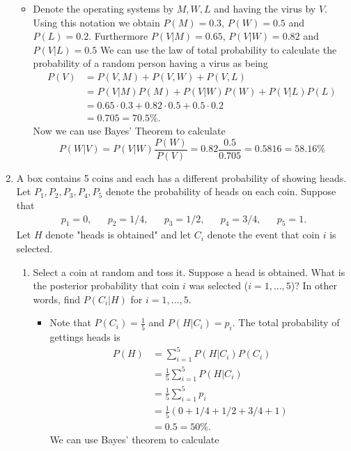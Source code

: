 \documentclass{article}
\begin{document}
\begin{enumerate}
		\begin{itemize}
			\item Denote the operating systems by $M, W, L$ and having the virus by $V$. Using this notation we obtain $P(M) = 0.3$, $P(W) = 0.5$ and $P(L) = 0.2$. Furthermore $P(V|M) = 0.65$, $P(V|W) = 0.82$ and $P(V|L) = 0.5$ We can use the law of total probability to calculate the probability of a random person having a virus as being
			$$
			\begin{aligned}
			P(V) &= P(V, M) + P(V, W) + P(V, L) \\
			&= P(V|M)P(M) + P(V|W)P(W) + P(V|L)P(L) \\
			&= 0.65 \cdot 0.3 + 0.82 \cdot 0.5 + 0.5 \cdot 0.2 \\
			&= 0.705 = 70.5\%.
			\end{aligned}
			$$
			Now we can use Bayes' Theorem to calculate
			$$
			P(W|V) = P(V|W) \frac{P(W)}{P(V)} = 0.82 \frac{0.5}{0.705} = 0.5816 = 58.16\%
			$$
		\end{itemize}
	\item A box contains 5 coins and each has a different probability of showing heads. Let $P_1, P_2, P_3, P_4, P_5$ denote the probability of heads on each coin. Suppose that
	$$
	\begin{aligned}
	p_1 = 0,&& p_2 = 1/4,&& p_3 = 1/2,&& p_4 = 3/4,&& p_5 = 1.
	\end{aligned}
	$$
	Let $H$ denote "heads is obtained" and let $C_i$ denote the event that coin $i$ is selected.
	\begin{enumerate}
		\item Select a coin at random and toss it. Suppose a head is obtained. What is the posterior probability that coin $i$ was selected ($i = 1, ..., 5$)? In other words, find $P(C_i|H)$ for $i = 1, ..., 5$.
			\begin{itemize}
				\item Note that $P(C_i) = \frac{1}{5}$ and $P(H|C_i) = p_i$. The total probability of gettings heads is
				$$
				\begin{aligned}
				P(H) &= \sum_{i = 1}^5 P(H|C_i)P(C_i) \\
				&= \frac{1}{5} \sum_{i = 1}^5 P(H|C_i) \\
				&= \frac{1}{5} \sum_{i = 1}^5 p_i \\
				&= \frac{1}{5} (0 + 1/4 + 1/2 + 3/4 + 1) \\
				&= 0.5 = 50\%.
				\end{aligned}
				$$
				We can use Bayes' theorem to calculate
				$$
				\begin{aligned}

\end{aligned}$$
\end{itemize}
\end{enumerate}
\end{enumerate}
\end{document}
